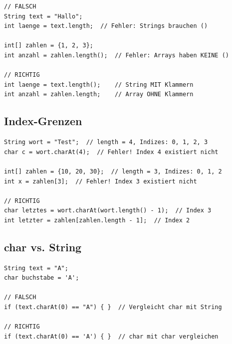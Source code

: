 \begin{lstlisting}
// FALSCH
String text = "Hallo";
int laenge = text.length;  // Fehler: Strings brauchen ()

int[] zahlen = {1, 2, 3};
int anzahl = zahlen.length();  // Fehler: Arrays haben KEINE ()

// RICHTIG
int laenge = text.length();    // String MIT Klammern
int anzahl = zahlen.length;    // Array OHNE Klammern
\end{lstlisting}

\subsection*{Index-Grenzen}

\begin{lstlisting}
String wort = "Test";  // length = 4, Indizes: 0, 1, 2, 3
char c = wort.charAt(4);  // Fehler! Index 4 existiert nicht

int[] zahlen = {10, 20, 30};  // length = 3, Indizes: 0, 1, 2
int x = zahlen[3];  // Fehler! Index 3 existiert nicht

// RICHTIG
char letztes = wort.charAt(wort.length() - 1);  // Index 3
int letzter = zahlen[zahlen.length - 1];  // Index 2
\end{lstlisting}

\subsection*{char vs. String}

\begin{lstlisting}
String text = "A";
char buchstabe = 'A';

// FALSCH
if (text.charAt(0) == "A") { }  // Vergleicht char mit String

// RICHTIG
if (text.charAt(0) == 'A') { }  // char mit char vergleichen
\end{lstlisting}
